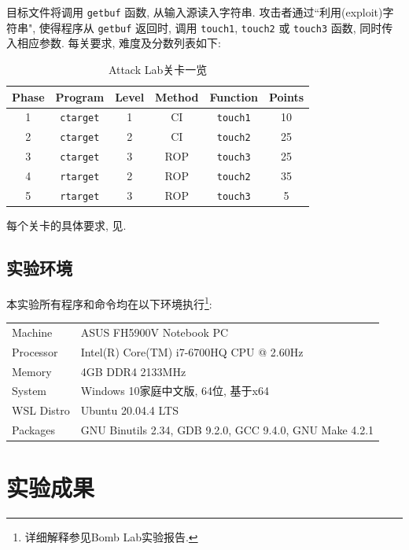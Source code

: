 目标文件将调用 \verb|getbuf| 函数, 从输入源读入字符串. 攻击者通过“利用(exploit)字符串", 使得程序从 \verb|getbuf| 返回时, 调用 \verb|touch1|, \verb|touch2| 或 \verb|touch3| 函数, 同时传入相应参数. 每关要求, 难度及分数列表如下:
\begin{table}[H]
    \centering
    \small
    \begin{tabular}{cccccc}
        \toprule
        Phase & Program        & Level & Method & Function      & Points \\
        \midrule
        1     & \verb|ctarget| & 1     & CI     & \verb|touch1| & 10     \\
        2     & \verb|ctarget| & 2     & CI     & \verb|touch2| & 25     \\
        3     & \verb|ctarget| & 3     & ROP    & \verb|touch3| & 25     \\
        4     & \verb|rtarget| & 2     & ROP    & \verb|touch2| & 35     \\
        5     & \verb|rtarget| & 3     & ROP    & \verb|touch3| & 5      \\
        \bottomrule
    \end{tabular}
    \caption{Attack Lab关卡一览}
\end{table}

每个关卡的具体要求, 见.

\subsection{实验环境}

本实验所有程序和命令均在以下环境执行\footnote{详细解释参见Bomb Lab实验报告.}:
\vspace{8pt}\par{\small\begin{tabular}{ll}
    Machine & ASUS FH5900V Notebook PC\\
    Processor & Intel(R) Core(TM) i7-6700HQ CPU @ 2.60Hz \\
    Memory & 4GB DDR4 2133MHz \\
    System & Windows 10家庭中文版, 64位, 基于x64 \\
    WSL Distro & Ubuntu 20.04.4 LTS \\
    Packages & GNU Binutils 2.34, GDB 9.2.0, GCC 9.4.0, GNU Make 4.2.1
\end{tabular}}

\section{实验成果}

